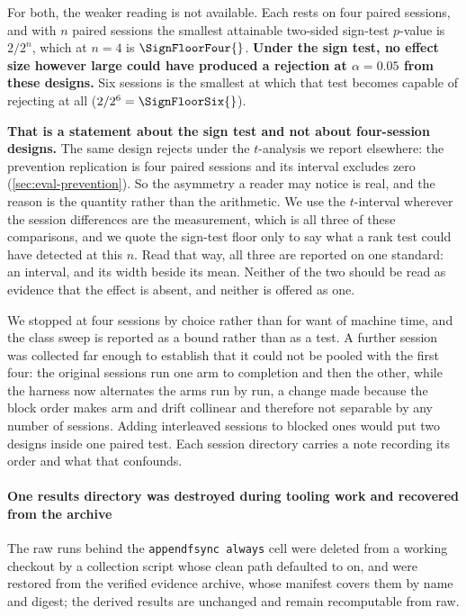 For both, the weaker reading is not available. Each rests on four paired
sessions, and with $n$ paired sessions the smallest attainable two-sided
sign-test $p$-value is $2/2^{n}$, which at $n=4$ is
$\SignFloorFour{}$. \textbf{Under the sign test, no effect size however large
could have produced a rejection at $\alpha=0.05$ from these designs.} Six
sessions is the smallest at which that test becomes capable of rejecting at all
($2/2^{6} = \SignFloorSix{}$).

\textbf{That is a statement about the sign test and not about four-session
designs.} The same design rejects under the $t$-analysis we report elsewhere:
the prevention replication is four paired sessions and its interval excludes
zero (\cref{sec:eval-prevention}). So the asymmetry a reader may notice is
real, and the reason is the quantity rather than the arithmetic. We use the
$t$-interval wherever the session differences are the measurement, which is all
three of these comparisons, and we quote the sign-test floor only to say what a
rank test could have detected at this $n$. Read that way, all three are
reported on one standard: an interval, and its width beside its mean. Neither
of the two should be read as evidence that the effect is absent, and neither is
offered as one.

We stopped at four sessions by choice rather than for want of machine
time, and the class sweep is reported as a bound rather than as a test.
A further session was collected far enough to establish that it could
not be pooled with the first four: the original sessions run one arm to
completion and then the other, while the harness now alternates the arms
run by run, a change made because the block order makes arm and drift
collinear and therefore not separable by any number of sessions. Adding
interleaved sessions to blocked ones would put two designs inside one
paired test. Each session directory carries a note recording its order and
what that confounds.

\paragraph{One results directory was destroyed during tooling work and
recovered from the archive} The raw runs behind the \texttt{appendfsync
always} cell were deleted from a working checkout by a collection script
whose clean path defaulted to on, and were restored from the verified
evidence archive, whose manifest covers them by name and digest; the
derived results are unchanged and remain recomputable from raw.

